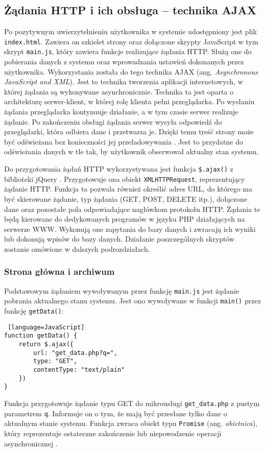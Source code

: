 \documentclass[a4paper,11pt,twoside]{article}
\begin{document}
\subsection{Żądania HTTP i ich obsługa -- technika AJAX}
Po pozytywnym uwierzytelnieniu użytkownika w systemie udostępniony jest plik \texttt{index.html}. Zawiera on szkielet strony oraz dołączone skrypty JavaScript w tym skrypt \texttt{main.js}, który zawiera funkcje realizujące żądania HTTP. Służą one do pobierania danych z systemu oraz wprowadzania ustawień dokonanych przez użytkownika. Wykorzystania została do tego technika AJAX (ang. \textit{Asynchronous JavaScript and XML}). Jest to technika tworzenia aplikacji internetowych, w której żądania są wykonywane asynchronicznie. Technika ta jest oparta o architekturę serwer-klient, w której rolę klienta pełni przeglądarka. Po wysłaniu żądania przeglądarka kontynuuje działanie, a w tym czasie serwer realizuje żądanie. Po zakończeniu obsługi żądania serwer wysyła odpowiedź do przeglądarki, która odbiera dane i przetwarza je. Dzięki temu treść strony może być odświeżana bez konieczności jej przeładowywania \cite{ajax}. Jest to przydatne do odświeżania danych w tle tak, by użytkownik obserwował aktualny stan systemu.

Do przygotowania żądań HTTP wykorzystywana jest funkcja \texttt{\$.ajax()} z biblioteki jQuery \cite{jquery_ajax}. Przygotowuje ona obiekt \texttt{XMLHTTPRequest}, reprezentujący żądanie HTTP. Funkcja ta pozwala również określić adres URL, do którego ma być skierowane żądanie, typ żądania (GET, POST, DELETE itp.), dołączone dane oraz pozostałe pola odpowiadające nagłówkom protokołu HTTP. Żądania te będą kierowane do dedykowanych programów w języku PHP działających na serwerze WWW. Wykonują one zapytania do bazy danych i zwracają ich wyniki lub dokonują wpisów do bazy danych. Działanie poszczególnych skryptów zostanie omówione w dalszych podrozdziałach.

\subsubsection{Strona główna i archiwum}
Podstawowym żądaniem wywoływanym przez funkcję \texttt{main.js} jest żądanie pobrania aktualnego stanu systemu. Jest ono wywoływane w funkcji \texttt{main()} przez funkcję \texttt{getData()}:
\begin{lstlisting} [language=JavaScript]
function getData() {
    return $.ajax({
        url: "get_data.php?q=",
        type: "GET",
        contentType: "text/plain"
    })
}
\end{lstlisting}
Funkcja przygotowuje żądanie typu GET do mikrousługi \texttt{get{\_}data.php} z pustym parametrem \texttt{q}. Informuje on o tym, że mają być przesłane tylko dane o aktualnym stanie systemu. Funkcja zwraca obiekt typu \texttt{Promise} (ang. \textit{obietnica}), który reprezentuje ostateczne zakończenie lub niepowodzenie operacji asynchronicznej \cite{promise}. 
\end{document}
